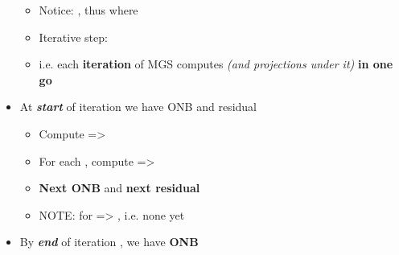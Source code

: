 \begin{itemize}
            \begin{itemize}

                  \item
                        Notice: , thus
                        where 
                  \item
                        Iterative step:
                  \item
                        i.e. each \textbf{iteration } of MGS computes 
                        \emph{(and projections under it)} \textbf{in one go}
            \end{itemize}
      \item
            At \textbf{\emph{start}} of iteration 
            we have ONB
            and residual

            \begin{itemize}

                  \item
                        Compute
                        =>
                  \item
                        For each , compute
                        => 
                  \item
                        \textbf{Next ONB}  and
                        \textbf{next residual} 
                  \item
                        NOTE: for  =>
                        ,
                        i.e. none yet
            \end{itemize}
      \item
            By \textbf{\emph{end}} of iteration , we have \textbf{ONB}


\end{itemize}
